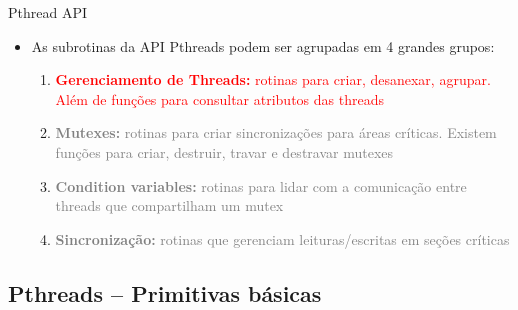 \documentclass[10pt, xcolor=x11names]{beamer}
\begin{document}
\begin{frame}
	\begin{block}{Pthread API}
		\begin{itemize}
			\item<1-> As subrotinas da API Pthreads podem ser agrupadas em 4 grandes grupos:
				\begin{enumerate}
					\item<1-> \textcolor<5->{red}{\textbf{Gerenciamento de Threads:} rotinas para criar, desanexar, agrupar. Além de funções para consultar atributos das threads}	

					\item<2-> \textcolor<5->{gray}{\textbf{Mutexes:} rotinas para criar sincronizações para áreas críticas. Existem funções para criar, destruir, travar e destravar mutexes}

					\item<3-> \textcolor<5->{gray}{\textbf{Condition variables:} rotinas para lidar com a comunicação entre threads que compartilham um mutex}

					\item<4-> \textcolor<5->{gray}{\textbf{Sincronização:} rotinas que gerenciam leituras/escritas em seções críticas}
				\end{enumerate}
			
		\end{itemize}
	\end{block}
\end{frame}

\subsection{Pthreads -- Primitivas básicas} %
\end{document}
